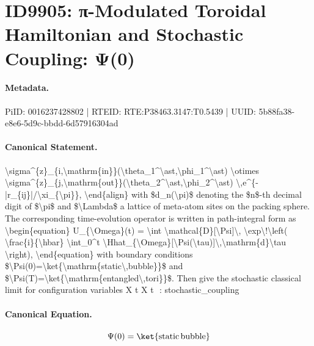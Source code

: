 \section*{ID9905: π-Modulated Toroidal Hamiltonian and Stochastic Coupling: Ψ(0)}
\paragraph{Metadata.}
PiID: 0016237428802 | RTEID: RTE:P38463.3147:T0.5439 | UUID: 5b88fa38-e8e6-5d9c-bbdd-6d57916304ad

\paragraph{Canonical Statement.}
\textbackslash{}sigma\textasciicircum{}\{z\}\_\{i,\textbackslash{}mathrm\{in\}\}(\textbackslash{}theta\_1\textasciicircum{}\textbackslash{}ast,\textbackslash{}phi\_1\textasciicircum{}\textbackslash{}ast) \textbackslash{}otimes \textbackslash{}sigma\textasciicircum{}\{z\}\_\{j,\textbackslash{}mathrm\{out\}\}(\textbackslash{}theta\_2\textasciicircum{}\textbackslash{}ast,\textbackslash{}phi\_2\textasciicircum{}\textbackslash{}ast) \textbackslash{},e\textasciicircum{}\{-|r\_\{ij\}|/\textbackslash{}xi\_\{\textbackslash{}pi\}\}, \textbackslash{}end\{align\} with \$d\_n(\textbackslash{}pi)\$ denoting the \$n\$-th decimal digit of \$\textbackslash{}pi\$ and \$\textbackslash{}Lambda\$ a lattice of meta-atom sites on the packing sphere. The corresponding time-evolution operator is written in path-integral form as \textbackslash{}begin\{equation\} U\_\{\textbackslash{}Omega\}(t) = \textbackslash{}int \textbackslash{}mathcal\{D\}[\textbackslash{}Psi]\textbackslash{}, \textbackslash{}exp\textbackslash{}!\textbackslash{}left( \textbackslash{}frac\{i\}\{\textbackslash{}hbar\} \textbackslash{}int\_0\textasciicircum{}t \textbackslash{}Hhat\_\{\textbackslash{}Omega\}[\textbackslash{}Psi(\textbackslash{}tau)]\textbackslash{},\textbackslash{}mathrm\{d\}\textbackslash{}tau \textbackslash{}right), \textbackslash{}end\{equation\} with boundary conditions \$\textbackslash{}Psi(0)=\textbackslash{}ket\{\textbackslash{}mathrm\{static\textbackslash{},bubble\}\}\$ and \$\textbackslash{}Psi(T)=\textbackslash{}ket\{\textbackslash{}mathrm\{entangled\textbackslash{},tori\}\}\$. Then give the stochastic classical limit for configuration variables X t X t ​ : stochastic\_coupling

\paragraph{Canonical Equation.}
\[
\Psi(0)=\ket{\mathrm{static\,bubble}}
\]

